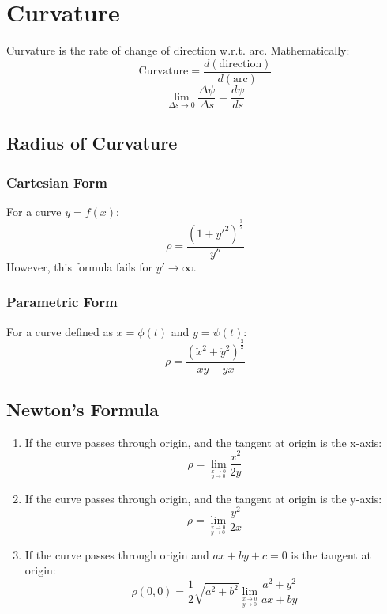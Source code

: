\documentclass[openany, oneside]{book}
\begin{document}
\section{Curvature}
Curvature is the rate of change of direction w.r.t. arc. Mathematically:
\begin{equation}
\text{Curvature}=\dfrac{d(\text{direction})}{d(\text{arc})}\nonumber
\end{equation}
\begin{equation}
\lim_{\Delta s \to 0} \dfrac{\Delta \psi}{\Delta s}=\dfrac{d\psi}{ds}
\end{equation}

\subsection{Radius of Curvature}
\subsubsection{Cartesian Form}
For a curve $y=f(x)$:
\begin{equation}
\rho=\dfrac{(1+y'^2)^{\frac{3}{2}}}{y''}
\end{equation}
However, this formula fails for $y'\to\infty$.
\subsubsection{Parametric Form}
For a curve defined as $x=\phi(t)$ and $y=\psi(t)$:
\begin{equation}
\rho=\dfrac{(\ddot{x}^2+\ddot{y}^2)^{\frac{3}{2}}}{x\ddot{y}-y\ddot{x}}
\end{equation}

\subsection{Newton's Formula}
\begin{enumerate}
\item If the curve passes through origin, and the tangent at origin is the x-axis:
\begin{equation}
\rho=\lim_{^{x\to0}_{y\to0}} \dfrac{x^2}{2y}
\end{equation}
\item If the curve passes through origin, and the tangent at origin is the y-axis:
\begin{equation}
\rho=\lim_{^{x\to0}_{y\to0}} \dfrac{y^2}{2x}
\end{equation}
\item If the curve passes through origin and $ax+by+c=0$ is the tangent at origin:
\begin{equation}
\rho(0,0)=\dfrac{1}{2}\sqrt{a^2+b^2} \lim_{^{x\to0}_{y\to0}} \dfrac{a^2+y^2}{ax+by}
\end{equation}
\end{enumerate}
\end{document}
